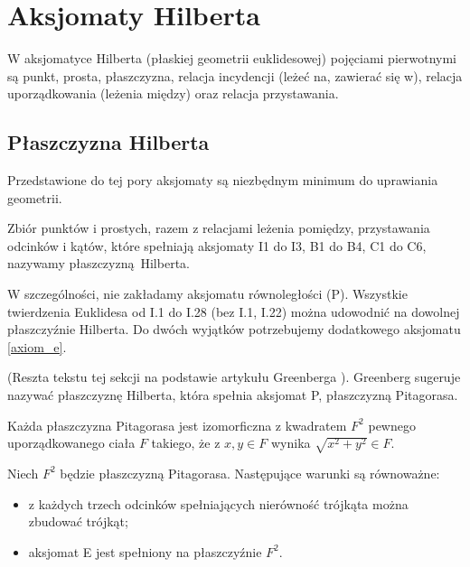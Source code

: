 %

\section{Aksjomaty Hilberta}
W aksjomatyce Hilberta (płaskiej geometrii euklidesowej) pojęciami pierwotnymi są punkt, prosta, płaszczyzna, relacja incydencji (leżeć na, zawierać się w), relacja uporządkowania (leżenia między) oraz relacja przystawania.






\subsection{Płaszczyzna Hilberta}

Przedstawione do tej pory aksjomaty są niezbędnym minimum do uprawiania geometrii.

\begin{definition}
    Zbiór punktów i prostych, razem z relacjami leżenia pomiędzy, przystawania odcinków i kątów, które spełniają aksjomaty I1 do I3, B1 do B4, C1 do C6, nazywamy płaszczyzną Hilberta.
\end{definition}

W szczególności, nie zakładamy aksjomatu równoległości (P).
Wszystkie twierdzenia Euklidesa od I.1 do I.28 (bez I.1, I.22) można udowodnić na dowolnej płaszczyźnie Hilberta.
Do dwóch wyjątków potrzebujemy dodatkowego aksjomatu \ref{axiom_e}.

(Reszta tekstu tej sekcji na podstawie artykułu Greenberga \cite[s. 201]{greenberg_2010}).
Greenberg sugeruje nazywać płaszczyznę Hilberta, która spełnia aksjomat P, płaszczyzną Pitagorasa.

\begin{proposition}
    Każda płaszczyzna Pitagorasa jest izomorficzna z kwadratem $F^2$ pewnego uporządkowanego ciała $F$ takiego, że z $x, y \in F$ wynika $\sqrt{x^2 + y^2} \in F$.
\end{proposition}

\begin{proposition}
    Niech $F^2$ będzie płaszczyzną Pitagorasa.
    Następujące warunki są równoważne:
    \begin{itemize}
        \item z każdych trzech odcinków spełniających nierówność trójkąta można zbudować trójkąt; 
        \item aksjomat E jest spełniony na płaszczyźnie $F^2$.
    \end{itemize}
\end{proposition}

